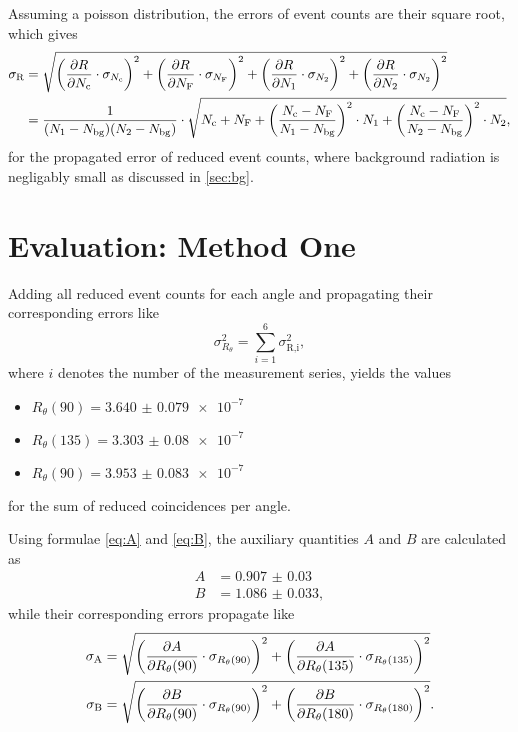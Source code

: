 Assuming a poisson distribution, the errors of event counts are their square root, which gives
\begin{align*}
	\sigma_\text{R} &= \sqrt{\left(\frac{\partial R}{\partial N_\text{c}}\cdot\sigma_{N_\text{c}}\right)^2
	+ \left(\frac{\partial R}{\partial N_\text{F}}\cdot\sigma_{N_\text{F}}\right)^2
	+ \left(\frac{\partial R}{\partial N_1}\cdot\sigma_{N_2}\right)^2
	+ \left(\frac{\partial R}{\partial N_2}\cdot\sigma_{N_2}\right)^2} \\
	&=\frac{1}{(N_1-N_\text{bg})(N_2-N_\text{bg})}
	\cdot\sqrt{N_\text{c} + N_\text{F} + \left(\frac{N_\text{c}-N_\text{F}}{N_1-N_\text{bg}}\right)^2\cdot N_1
	+ \left(\frac{N_\text{c}-N_\text{F}}{N_2-N_\text{bg}}\right)^2\cdot N_2},
\end{align*}
for the propagated error of reduced event counts, where background radiation is negligably small as discussed in \autoref{sec:bg}.

\section{Evaluation: Method One}
Adding all reduced event counts for each angle and propagating their corresponding errors like
\begin{equation*}
	\sigma_{R_\theta}^2=\sum_{i=1}^{6}\sigma_\text{R,i}^2,
\end{equation*}
where $i$ denotes the number of the measurement series, yields the values
\begin{itemize}
	\item $R_\theta (90)=\num{3.640(79)e-7}$
	\item $R_\theta (135)=\num{3.303(80)e-7}$
	\item $R_\theta (90)=\num{3.953(83)e-7}$
\end{itemize}
for the sum of reduced coincidences per angle.

Using formulae \ref{eq:A} and \ref{eq:B}, the auxiliary quantities $A$ and $B$ are calculated as
\begin{align*}
	A &= \num{0.907(30)} \\
	B &= \num{1.086(33)},
\end{align*}
while their corresponding errors propagate like
\begin{align}
	\sigma_\text{A} &= \sqrt{\left(\frac{\partial A}{\partial R_\theta (90)}\cdot\sigma_{R_\theta(90)}\right)^2 + \left(\frac{\partial A}{\partial R_\theta (135)}\cdot\sigma_{R_\theta(135)}\right)^2} \label{eq:err_A} \\
	\sigma_\text{B} &= \sqrt{\left(\frac{\partial B}{\partial R_\theta (90)}\cdot\sigma_{R_\theta(90)}\right)^2 + \left(\frac{\partial B}{\partial R_\theta (180)}\cdot\sigma_{R_\theta(180)}\right)^2}. \nonumber
\end{align}

